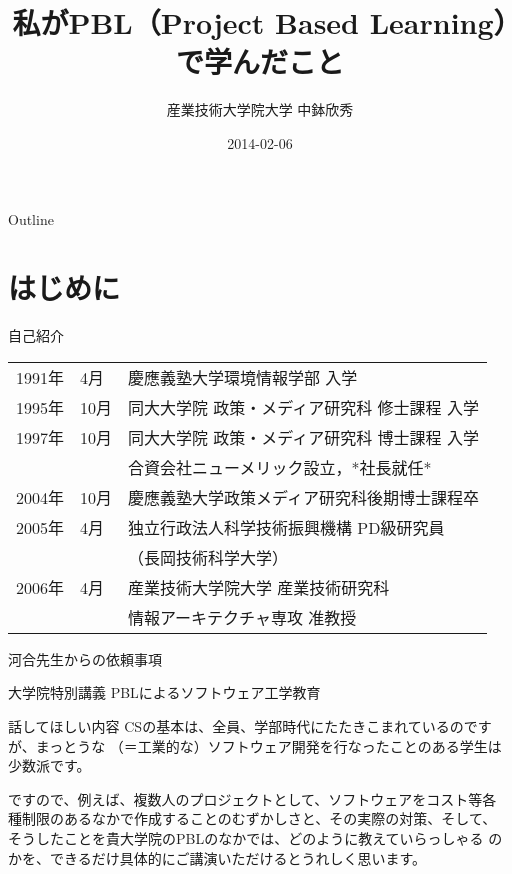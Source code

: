 \documentclass[dvipdfmx]{beamer}
\author{産業技術大学院大学 \linebreak 中鉢欣秀}
\date{2014-02-06}
\title{私がPBL（Project Based Learning）で学んだこと}
\begin{document}
\maketitle
\begin{frame}{Outline}
\tableofcontents
\end{frame}


\section{はじめに}
\label{sec-1}
\begin{frame}[label=sec-1-1]{自己紹介}
\begin{center}
\begin{tabular}{lll}
1991年 & 4月 & 慶應義塾大学環境情報学部 入学\\
1995年 & \alert{10月} & 同大大学院 政策・メディア研究科 修士課程 入学\\
1997年 & 10月 & 同大大学院 政策・メディア研究科 博士課程 入学\\
 &  & 合資会社ニューメリック設立，*社長就任*\\
2004年 & 10月 & 慶應義塾大学政策メディア研究科後期博士課程卒\\
2005年 & 4月 & 独立行政法人科学技術振興機構 PD級研究員\\
 &  & （長岡技術科学大学）\\
2006年 & 4月 & 産業技術大学院大学 産業技術研究科\\
 &  & 情報アーキテクチャ専攻 准教授\\
\end{tabular}
\end{center}
\end{frame}
\begin{frame}[label=sec-1-2]{河合先生からの依頼事項}
\begin{block}{大学院特別講義}
PBLによるソフトウェア工学教育
\end{block}
\begin{block}{話してほしい内容}
CSの基本は、全員、学部時代にたたきこまれているのですが、まっとうな
（＝工業的な）ソフトウェア開発を行なったことのある学生は少数派です。

ですので、例えば、複数人のプロジェクトとして、ソフトウェアをコスト等各
種制限のあるなかで作成することのむずかしさと、その実際の対策、そして、
そうしたことを貴大学院のPBLのなかでは、どのように教えていらっしゃる
のかを、できるだけ具体的にご講演いただけるとうれしく思います。
\end{block}
\end{frame}
\end{document}
